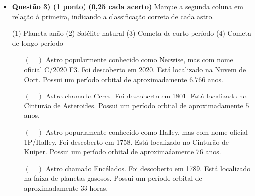 \documentclass[a4paper, 12pt]{article}
\begin{document}
\begin{itemize}
		\item \textbf{Questão 3) (1 ponto) (0,25 cada acerto)} Marque a segunda coluna em relação à primeira, indicando a classificação correta de cada astro.
			\begin{multicols}{2}
				\vfill\null \vfill\null
				\begin{flushleft}
					(1) Planeta anão \linebreak
					(2) Satélite natural \linebreak
					(3) Cometa de curto período \linebreak
					(4) Cometa de longo período
				\end{flushleft}
				\vfill\null \vfill\null
				\columnbreak
				\begin{itemize}
					\item[$(\quad)$] Astro popularmente conhecido como Neowise, mas com nome oficial C/2020 F3. Foi descoberto em 2020. Está localizado na Nuvem de Oort. Possui um período orbital de aproximadamente $6.766$ anos.
					\item[$(\quad)$] Astro chamado Ceres. Foi descoberto em 1801. Está localizado no Cinturão de Asteroides. Possui um período orbital de aproximadamente $5$ anos.
					\item[$(\quad)$] Astro popurlamente conhecido como Halley, mas com nome oficial 1P/Halley. Foi descoberto em 1758. Está localizado no Cinturão de Kuiper. Possui um período orbital de aproximadamente $76$ anos.
					\item[$(\quad)$] Astro chamado Encélados. Foi descoberto em 1789. Está localizado na faixa de planetas gasosos. Possui um período orbital de aproximadamente 33 horas.
				\end{itemize}


\end{multicols}
\end{itemize}
\end{document}
